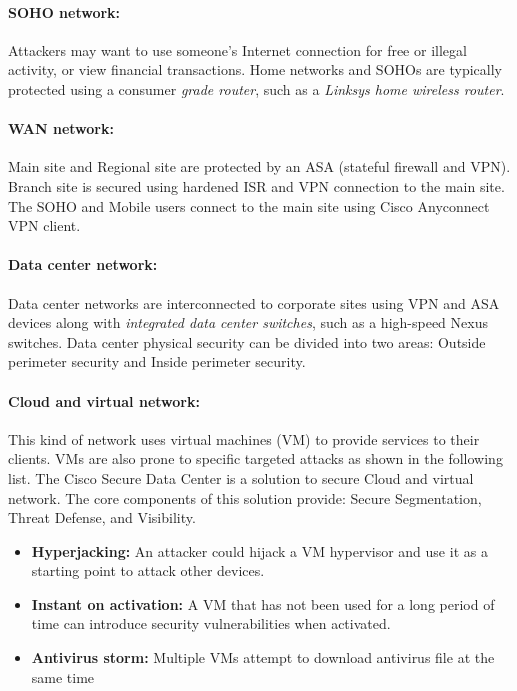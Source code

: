 \paragraph{SOHO network:} Attackers may want to use someone's Internet connection for free or illegal activity, or view financial transactions. Home networks and SOHOs are typically protected using a consumer \emph{grade router}, such as a \emph{Linksys home wireless router}. 

\paragraph{WAN network:} Main site and Regional site are protected by an ASA (stateful firewall and VPN). Branch site is secured using hardened ISR and VPN connection to the main site. The SOHO and Mobile users connect to the main site using Cisco Anyconnect VPN client. 

\paragraph{Data center network:} Data center networks are interconnected to corporate sites using VPN and ASA devices along with \emph{integrated data center switches}, such as a high-speed Nexus switches. Data center physical security can be divided into two areas: Outside perimeter security and Inside perimeter security. 

\paragraph{Cloud and virtual network:} This kind of network uses virtual machines (VM) to provide services to their clients.  VMs are also prone to specific targeted attacks as shown in the following list. The Cisco Secure Data Center is a solution to secure Cloud and virtual network. The core components of this solution provide: Secure Segmentation, Threat Defense, and Visibility.

\begin{itemize}
\item \textbf{Hyperjacking:} An attacker could hijack a VM hypervisor and use it as a starting point to attack other devices.
\item \textbf{Instant on activation:} A VM that has not been used for a long period of time can introduce security vulnerabilities when activated.
\item \textbf{Antivirus storm:} Multiple VMs attempt to download antivirus file at the same time
\end{itemize}

